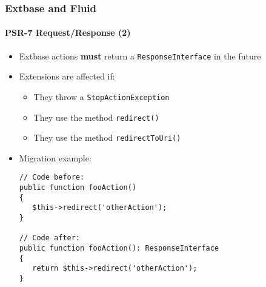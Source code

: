 %

\begin{frame}[fragile]
	\frametitle{Extbase and Fluid}
	\framesubtitle{PSR-7 Request/Response (2)}


	\begin{itemize}
		\item Extbase actions \textbf{must} return a \texttt{ResponseInterface}
			in the future
		\item Extensions are affected if:
			\begin{itemize}
				\item They throw a \texttt{StopActionException}
				\item They use the method \texttt{redirect()}
				\item They use the method \texttt{redirectToUri()}
			\end{itemize}
		\item Migration example:
\begin{lstlisting}
// Code before:
public function fooAction()
{
   $this->redirect('otherAction');
}

// Code after:
public function fooAction(): ResponseInterface
{
   return $this->redirect('otherAction');
}
\end{lstlisting}

	\end{itemize}

\end{frame}

